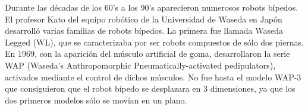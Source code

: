 Durante las décadas de los 60's a los 90's aparecieron numerosos robots bípedos. El profesor Kato del equipo robótico de la Universidad de Waseda en Japón desarrolló varias familias de robots bípedos. La primera fue llamada Waseda Legged (WL), que se caracterizaba por ser robots compuestos de sólo dos piernas. En 1969, con la aparición del músculo artificial de goma, desarrollaron la serie WAP (Waseda's Anthropomorphic Pneumatically-activated pedipulators), activados mediante el control de dichos músculos. No fue hasta el modelo WAP-3 que consiguieron que el robot bípedo se desplazara en 3 dimensiones, ya que los dos primeros modelos sólo se movían en un plano.

\begin{figure}[H]
\centering
{}
\quad
\subfigure[WL-3]

\end{figure}

